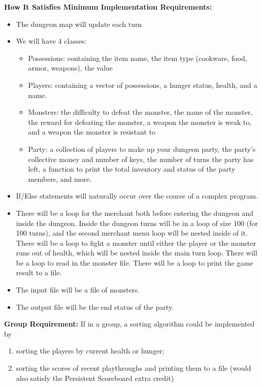\textbf{How It Satisfies Minimum Implementation Requirements:}
\begin{itemize}
    \item The dungeon map will update each turn
    \item We will have 4 classes:
    \begin{itemize}
        \item Possessions: containing the item name, the item type (cookware, food, armor, weapons), the value
        \item Players: containing a vector of possessions, a hunger status, health, and a name.
        \item Monsters: the difficulty to defeat the monster, the name of the monster, the reward for defeating the monster, a weapon the monster is weak to, and a weapon the monster is resistant to
        \item Party: a collection of players to make up your dungeon party, the party's collective money and number of keys, the number of turns the party has left, a function to print the total inventory and status of the party members, and more.
    \end{itemize}
    \item If/Else statements will naturally occur over the course of a complex program.
    \item There will be a loop for the merchant both before entering the dungeon and inside the dungeon. Inside the dungeon turns will be in a loop of size 100 (for 100 turns), and the second merchant menu loop will be nested inside of it. There will be a loop to fight a monster until either the player or the monster runs out of health, which will be nested inside the main turn loop. There will be a loop to read in the monster file. There will be a loop to print the game result to a file.
    \item The input file will be a file of monsters.
    \item The output file will be the end status of the party.
\end{itemize}

\textbf{Group Requirement:} If in a group, a sorting algorithm could be implemented by 
\begin{enumerate}
    \item sorting the players by current health or hunger;
    \item sorting the scores of recent playthroughs and printing them to a file (would also satisfy the Persistent Scoreboard extra credit)
\end{enumerate}

